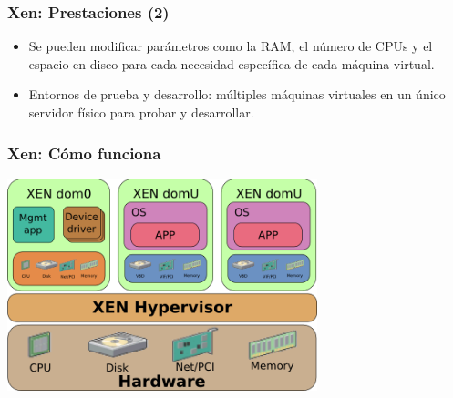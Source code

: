 \documentclass{beamer}
\begin{document}

\begin{frame}
\frametitle{Xen: Prestaciones (2)}
\begin{itemize}

\item Se pueden \alert{modificar parámetros} como la RAM, el número de CPUs y el espacio en disco para cada necesidad específica de cada máquina virtual.
\item \alert{Entornos de prueba} y desarrollo: múltiples máquinas virtuales en un único servidor físico para probar y desarrollar.
\end{itemize}

\end{frame}



\begin{frame}
\frametitle{Xen: Cómo funciona}
\begin{center}
\includegraphics[width=9cm]{figs/XEN-schema.png}
\end{center}
\end{frame}

\end{document}
